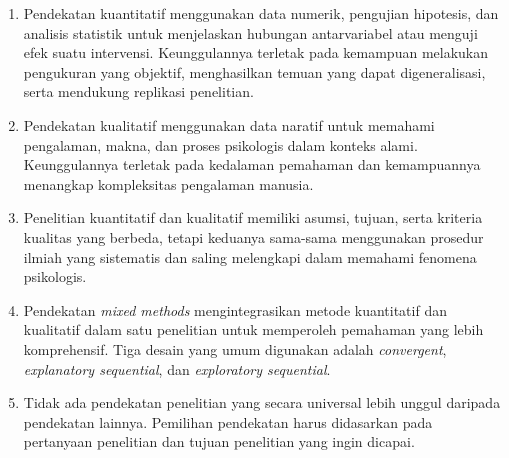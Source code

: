 \documentclass[
  indonesian,
  letterpaper,
  DIV=11,
  numbers=noendperiod]{scrreprt}
\providecommand{\tightlist}{%
  \setlength{\itemsep}{0pt}\setlength{\parskip}{0pt}}
\begin{document}
\begin{tcolorbox}[enhanced jigsaw, colframe=quarto-callout-tip-color-frame, toptitle=1mm, breakable, leftrule=.75mm, arc=.35mm, toprule=.15mm, colback=white, colbacktitle=quarto-callout-tip-color!10!white, bottomtitle=1mm, bottomrule=.15mm, titlerule=0mm, title=\textcolor{quarto-callout-tip-color}{\faLightbulb}\hspace{0.5em}{Rangkuman}, coltitle=black, left=2mm, opacitybacktitle=0.6, opacityback=0, rightrule=.15mm]

\begin{enumerate}
\def\labelenumi{\arabic{enumi}.}
\tightlist
\item
  Pendekatan kuantitatif menggunakan data numerik, pengujian hipotesis,
  dan analisis statistik untuk menjelaskan hubungan antarvariabel atau
  menguji efek suatu intervensi. Keunggulannya terletak pada kemampuan
  melakukan pengukuran yang objektif, menghasilkan temuan yang dapat
  digeneralisasi, serta mendukung replikasi penelitian.
\item
  Pendekatan kualitatif menggunakan data naratif untuk memahami
  pengalaman, makna, dan proses psikologis dalam konteks alami.
  Keunggulannya terletak pada kedalaman pemahaman dan kemampuannya
  menangkap kompleksitas pengalaman manusia.
\item
  Penelitian kuantitatif dan kualitatif memiliki asumsi, tujuan, serta
  kriteria kualitas yang berbeda, tetapi keduanya sama-sama menggunakan
  prosedur ilmiah yang sistematis dan saling melengkapi dalam memahami
  fenomena psikologis.
\item
  Pendekatan \emph{mixed methods} mengintegrasikan metode kuantitatif
  dan kualitatif dalam satu penelitian untuk memperoleh pemahaman yang
  lebih komprehensif. Tiga desain yang umum digunakan adalah
  \emph{convergent}, \emph{explanatory sequential}, dan
  \emph{exploratory sequential}.
\item
  Tidak ada pendekatan penelitian yang secara universal lebih unggul
  daripada pendekatan lainnya. Pemilihan pendekatan harus didasarkan
  pada pertanyaan penelitian dan tujuan penelitian yang ingin dicapai.
\end{enumerate}

\end{tcolorbox}
\end{document}
